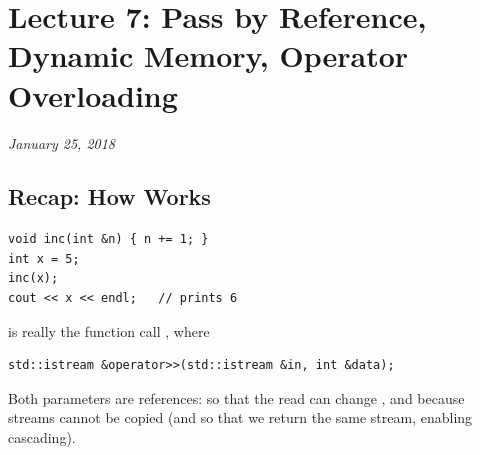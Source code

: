 \chapter{Lecture 7: Pass by Reference, Dynamic Memory, Operator Overloading}
\begin{center}
\textit{January 25, 2018}
\end{center}

\section{Recap: How  Works}
\begin{lstlisting}[style=cpp]
void inc(int &n) { n += 1; }
int x = 5;
inc(x);
cout << x << endl;   // prints 6
\end{lstlisting}
 is really the function call , where
\begin{lstlisting}[style=cpp]
std::istream &operator>>(std::istream &in, int &data);
\end{lstlisting}
Both parameters are references:  so that the read can change
, and  because streams cannot be copied (and so that we return
the same stream, enabling cascading).

